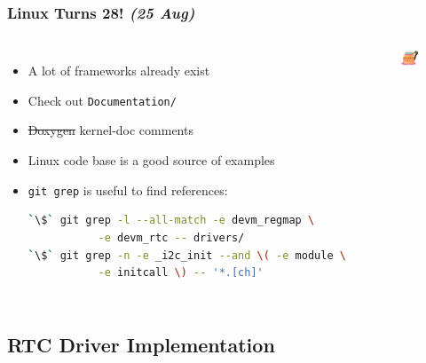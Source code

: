 \documentclass[aspectratio=169,usenames,dvipsnames]{beamer}
\newcounter{cont}
\begin{document}
\begin{frame}[containsverbatim]
  \frametitle{Linux Turns 28! \textit{(25 Aug)}}
  \begin{columns}
      \begin{itemize}
        \item A lot of frameworks already exist
        \item Check out \texttt{Documentation/}
        \item \sout{Doxygen} kernel-doc comments
        \item Linux code base is a good source of examples
        \item \texttt{git grep} is useful to find references:
          \begin{lstlisting}[language=bash]
`\$` git grep -l --all-match -e devm_regmap \
           -e devm_rtc -- drivers/
`\$` git grep -n -e _i2c_init --and \( -e module \
           -e initcall \) -- '*.[ch]'
          \end{lstlisting}
      \end{itemize}
      \begin{figure}
        \centering
        \includegraphics[scale=0.4]{images/linux-bday.png}
      \end{figure}
      \vspace*{-6mm}
  \end{columns}
\end{frame}


\subsection{RTC Driver Implementation}
\end{document}
